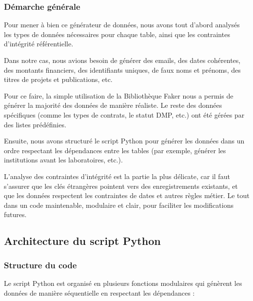 \documentclass[12pt,a4paper]{article}
\begin{document}
\subsubsection{Démarche générale}
Pour mener à bien ce générateur de données, nous avons tout d'abord analysés les types de données nécessaires pour chaque table, ainsi que les contraintes d'intégrité référentielle.

Dans notre cas, nous avions besoin de générer des emails, des dates cohérentes, des montants financiers, des identifiants uniques, de faux noms et prénoms, des titres de projets et publications, etc.

Pour ce faire, la simple utilisation de la Bibliothèque Faker nous a permis de générer la majorité des données de manière réaliste. Le reste des données spécifiques (comme les types de contrats, le statut DMP, etc.) ont été gérées par des listes prédéfinies.

Ensuite, nous avons structuré le script Python pour générer les données dans un ordre respectant les dépendances entre les tables (par exemple, générer les institutions avant les laboratoires, etc.).

L'analyse des contraintes d'intégrité est la partie la plus délicate, car il faut s'assurer que les clés étrangères pointent vers des enregistrements existants, et que les données respectent les contraintes de dates et autres règles métier. Le tout dans un code maintenable, modulaire et clair, pour faciliter les modifications futures.

\subsection{Architecture du script Python}

\subsubsection{Structure du code}
Le script Python est organisé en plusieurs fonctions modulaires qui génèrent les données de manière séquentielle en respectant les dépendances :
\end{document}
